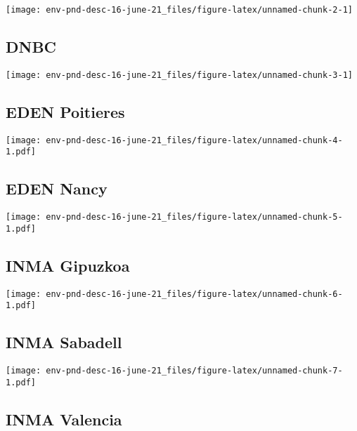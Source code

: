 \documentclass[]{article}
\begin{document}
\texttt{[image: env-pnd-desc-16-june-21\_files/figure-latex/unnamed-chunk-2-1]}

\newpage

\hypertarget{dnbc}{%
\subsection{DNBC}\label{dnbc}}

\texttt{[image: env-pnd-desc-16-june-21\_files/figure-latex/unnamed-chunk-3-1]}

\newpage

\hypertarget{eden-poitieres}{%
\subsection{EDEN Poitieres}\label{eden-poitieres}}

\texttt{[image: env-pnd-desc-16-june-21\_files/figure-latex/unnamed-chunk-4-1.pdf]}

\newpage

\hypertarget{eden-nancy}{%
\subsection{EDEN Nancy}\label{eden-nancy}}

\texttt{[image: env-pnd-desc-16-june-21\_files/figure-latex/unnamed-chunk-5-1.pdf]}

\hypertarget{inma-gipuzkoa}{%
\subsection{INMA Gipuzkoa}\label{inma-gipuzkoa}}

\texttt{[image: env-pnd-desc-16-june-21\_files/figure-latex/unnamed-chunk-6-1.pdf]}

\newpage

\hypertarget{inma-sabadell}{%
\subsection{INMA Sabadell}\label{inma-sabadell}}

\texttt{[image: env-pnd-desc-16-june-21\_files/figure-latex/unnamed-chunk-7-1.pdf]}

\newpage

\hypertarget{inma-valencia}{%
\subsection{INMA Valencia}\label{inma-valencia}}
\end{document}
